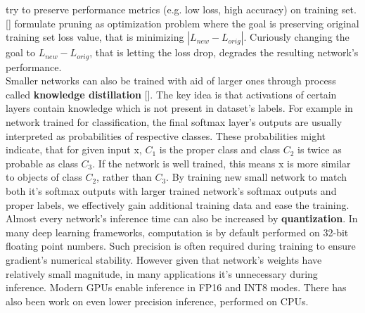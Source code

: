 \documentclass[../Main.tex]{subfiles}
\begin{document}
    try to preserve performance metrics (e.g. low loss, high accuracy) on training set. 
    [\cite{molchanov2016pruning}] formulate pruning as optimization problem where
    the goal is preserving original training set loss value, that is minimizing
    $|L_{new} - L_{orig}|$. Curiously changing the goal to $L_{new} - L_{orig}$,
    that is letting the loss drop, degrades the resulting network's performance.\\
    Smaller networks can also be trained with aid of larger ones through process called
    \textbf{knowledge distillation} [\cite{hinton2015distilling}]. 
    The key idea is that activations of certain layers
    contain knowledge which is not present in dataset's labels. For example in network 
    trained for classification, the final softmax layer's outputs are usually 
    interpreted as probabilities of respective classes. These probabilities might indicate,
    that for given input x, $C_1$ is the proper class and class $C_2$ is twice as probable 
    as class $C_3$. If the network is well trained, this means x is more similar to
    objects of class $C_2$, rather than $C_3$. By training new small network to match both
    it's softmax outputs with larger trained network's softmax outputs and proper labels,
    we effectively gain additional training data and ease the training.
    Almost every network's inference time can also be increased by \textbf{quantization}.
    In many deep learning frameworks, computation is by default performed on
    32-bit floating point numbers. Such precision is often required during training to 
    ensure gradient's numerical stability. However given that network's weights have
    relatively small magnitude, in many applications it's unnecessary during inference.
    Modern GPUs enable inference in FP16 and INT8 modes. There has also been work 
    on even lower precision inference, performed on CPUs. 
    
        
\biblio %
\end{document}
